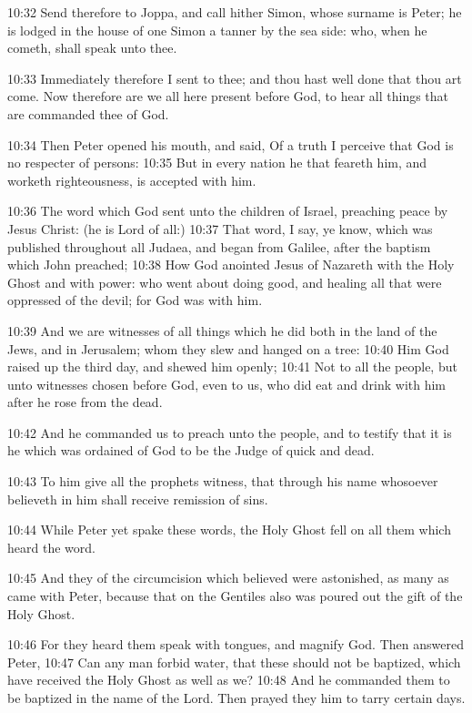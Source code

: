 10:32 Send therefore to Joppa, and call hither Simon, whose surname is
Peter; he is lodged in the house of one Simon a tanner by the sea
side: who, when he cometh, shall speak unto thee.

10:33 Immediately therefore I sent to thee; and thou hast well done
that thou art come. Now therefore are we all here present before God,
to hear all things that are commanded thee of God.

10:34 Then Peter opened his mouth, and said, Of a truth I perceive
that God is no respecter of persons: 10:35 But in every nation he that
feareth him, and worketh righteousness, is accepted with him.

10:36 The word which God sent unto the children of Israel, preaching
peace by Jesus Christ: (he is Lord of all:) 10:37 That word, I say, ye
know, which was published throughout all Judaea, and began from
Galilee, after the baptism which John preached; 10:38 How God anointed
Jesus of Nazareth with the Holy Ghost and with power: who went about
doing good, and healing all that were oppressed of the devil; for God
was with him.

10:39 And we are witnesses of all things which he did both in the land
of the Jews, and in Jerusalem; whom they slew and hanged on a tree:
10:40 Him God raised up the third day, and shewed him openly; 10:41
Not to all the people, but unto witnesses chosen before God, even to
us, who did eat and drink with him after he rose from the dead.

10:42 And he commanded us to preach unto the people, and to testify
that it is he which was ordained of God to be the Judge of quick and
dead.

10:43 To him give all the prophets witness, that through his name
whosoever believeth in him shall receive remission of sins.

10:44 While Peter yet spake these words, the Holy Ghost fell on all
them which heard the word.

10:45 And they of the circumcision which believed were astonished, as
many as came with Peter, because that on the Gentiles also was poured
out the gift of the Holy Ghost.

10:46 For they heard them speak with tongues, and magnify God. Then
answered Peter, 10:47 Can any man forbid water, that these should not
be baptized, which have received the Holy Ghost as well as we?  10:48
And he commanded them to be baptized in the name of the Lord. Then
prayed they him to tarry certain days.


